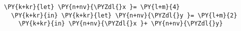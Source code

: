 \begin{Verbatim}[commandchars=\\\{\}]
\PY{k+kr}{let} \PY{n+nv}{\PYZdl{}x }= \PY{l+m}{4}
  \PY{k+kr}{in} \PY{k+kr}{let} \PY{n+nv}{\PYZdl{}y }= \PY{l+m}{2}
    \PY{k+kr}{in} \PY{n+nv}{\PYZdl{}x }+ \PY{n+nv}{\PYZdl{}y}
\end{Verbatim}
